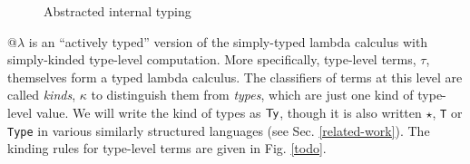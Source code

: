 \documentclass[9pt,preprint]{sigplanconf}
\begin{document}
\begin{figure}[t]
\begin{mathpar}

%
%
%
%
%
%

\end{mathpar}
\caption{\small Abstracted internal typing}
\label{ait}
\end{figure}
@$\lambda$ is an ``actively typed'' version of the simply-typed lambda calculus with simply-kinded type-level computation. More specifically, type-level terms, $\tau$, themselves form a typed lambda calculus. The classifiers of terms at this level are called \emph{kinds}, $\kappa$ to distinguish them from  \emph{types}, which are just one kind  of type-level value. We will write the kind of types as $\kTypeBlur$, though it is also written $\star$, \verb|T| or \verb|Type| in various similarly structured languages (see Sec. \ref{related-work}). The kinding rules for type-level terms are given in Fig. \ref{todo}.%
\end{document}

